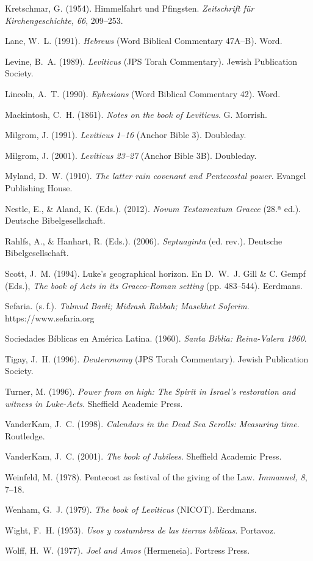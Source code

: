\documentclass[11pt,letterpaper]{article}
\newcommand{\refapa}[1]{\par{\RaggedRight\hangindent=1.27cm\hangafter=1\noindent #1\par}\vspace{4pt}}
\begin{document}
\refapa{Kretschmar, G. (1954). Himmelfahrt und Pfingsten. \emph{Zeitschrift für Kirchengeschichte, 66}, 209--253.}
\refapa{Lane, W.~L. (1991). \emph{Hebrews} (Word Biblical Commentary 47A--B). Word.}
\refapa{Levine, B.~A. (1989). \emph{Leviticus} (JPS Torah Commentary). Jewish Publication Society.}
\refapa{Lincoln, A.~T. (1990). \emph{Ephesians} (Word Biblical Commentary 42). Word.}
\refapa{Mackintosh, C.~H. (1861). \emph{Notes on the book of Leviticus}. G. Morrish.}
\refapa{Milgrom, J. (1991). \emph{Leviticus 1--16} (Anchor Bible 3). Doubleday.}
\refapa{Milgrom, J. (2001). \emph{Leviticus 23--27} (Anchor Bible 3B). Doubleday.}
\refapa{Myland, D.~W. (1910). \emph{The latter rain covenant and Pentecostal power}. Evangel Publishing House.}
\refapa{Nestle, E., \& Aland, K. (Eds.). (2012). \emph{Novum Testamentum Graece} (28.ª ed.). Deutsche Bibelgesellschaft.}
\refapa{Rahlfs, A., \& Hanhart, R. (Eds.). (2006). \emph{Septuaginta} (ed. rev.). Deutsche Bibelgesellschaft.}
\refapa{Scott, J.~M. (1994). Luke's geographical horizon. En D.~W.~J. Gill \& C. Gempf (Eds.), \emph{The book of Acts in its Graeco-Roman setting} (pp. 483--544). Eerdmans.}
\refapa{Sefaria. (s.\,f.). \emph{Talmud Bavli; Midrash Rabbah; Masekhet Soferim}. https://www.sefaria.org}
\refapa{Sociedades Bíblicas en América Latina. (1960). \emph{Santa Biblia: Reina-Valera 1960}.}
\refapa{Tigay, J.~H. (1996). \emph{Deuteronomy} (JPS Torah Commentary). Jewish Publication Society.}
\refapa{Turner, M. (1996). \emph{Power from on high: The Spirit in Israel's restoration and witness in Luke-Acts}. Sheffield Academic Press.}
\refapa{VanderKam, J.~C. (1998). \emph{Calendars in the Dead Sea Scrolls: Measuring time}. Routledge.}
\refapa{VanderKam, J.~C. (2001). \emph{The book of Jubilees}. Sheffield Academic Press.}
\refapa{Weinfeld, M. (1978). Pentecost as festival of the giving of the Law. \emph{Immanuel, 8}, 7--18.}
\refapa{Wenham, G.~J. (1979). \emph{The book of Leviticus} (NICOT). Eerdmans.}
\refapa{Wight, F.~H. (1953). \emph{Usos y costumbres de las tierras bíblicas}. Portavoz.}
\refapa{Wolff, H.~W. (1977). \emph{Joel and Amos} (Hermeneia). Fortress Press.}
\end{document}
